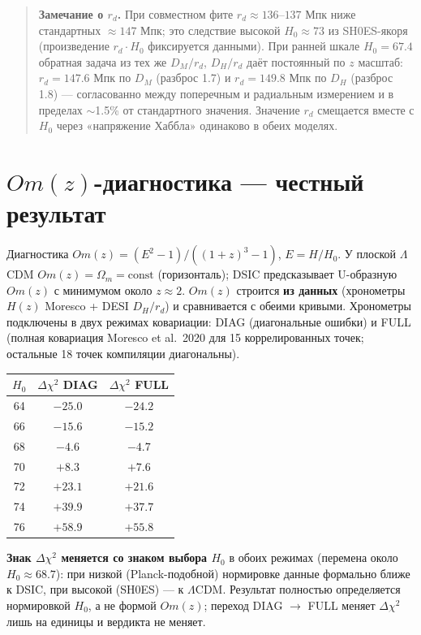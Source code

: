 \documentclass{article}
\begin{document}
\begin{quote}
\textbf{Замечание о $r_d$.} При совместном фите $r_d \approx 136\text{--}137$ Мпк ниже стандартных $\approx 147$ Мпк; это следствие высокой $H_0 \approx 73$ из SH0ES-якоря (произведение $r_d\cdot H_0$ фиксируется данными). При ранней шкале $H_0 = 67.4$ обратная задача из тех же $D_M/r_d$, $D_H/r_d$ даёт постоянный по $z$ масштаб: $r_d = 147.6$ Мпк по $D_M$ (разброс 1.7) и $r_d = 149.8$ Мпк по $D_H$ (разброс 1.8) --- согласованно между поперечным и радиальным измерением и в пределах $\sim$1.5\% от стандартного значения. Значение $r_d$ смещается вместе с $H_0$ через «напряжение Хаббла» одинаково в обеих моделях.
\end{quote}

\section{$Om(z)$-диагностика --- честный результат}

Диагностика $Om(z) = (E^2 - 1)/((1+z)^3 - 1)$, $E = H/H_0$. У плоской $\Lambda$CDM $Om(z) = \Omega_m = \text{const}$ (горизонталь); DSIC предсказывает U-образную $Om(z)$ с минимумом около $z \approx 2$. $Om(z)$ строится \textbf{из данных} (хронометры $H(z)$ Moresco + DESI $D_H/r_d$) и сравнивается с обеими кривыми. Хронометры подключены в двух режимах ковариации: DIAG (диагональные ошибки) и FULL (полная ковариация Moresco et al.\ 2020 для 15 коррелированных точек; остальные 18 точек компиляции диагональны).

\begin{center}
\small
\begin{tabular}{@{}ccc@{}}
\toprule
$H_0$ & $\Delta\chi^2$ DIAG & $\Delta\chi^2$ FULL \\
\midrule
64 & $-25.0$ & $-24.2$ \\
66 & $-15.6$ & $-15.2$ \\
68 & $-4.6$ & $-4.7$ \\
70 & $+8.3$ & $+7.6$ \\
72 & $+23.1$ & $+21.6$ \\
74 & $+39.9$ & $+37.7$ \\
76 & $+58.9$ & $+55.8$ \\
\bottomrule
\end{tabular}
\end{center}

\textbf{Знак $\Delta\chi^2$ меняется со знаком выбора $H_0$} в обоих режимах (перемена около $H_0 \approx 68.7$): при низкой (Planck-подобной) нормировке данные формально ближе к DSIC, при высокой (SH0ES) --- к $\Lambda$CDM. Результат полностью определяется нормировкой $H_0$, а не формой $Om(z)$; переход DIAG $\to$ FULL меняет $\Delta\chi^2$ лишь на единицы и вердикта не меняет.
\end{document}
